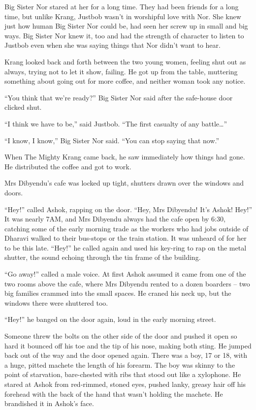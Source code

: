 Big Sister Nor stared at her for a long time. They had been friends
for a long time, but unlike Krang, Justbob wasn't in worshipful
love with Nor. She knew just how human Big Sister Nor could be, had
seen her screw up in small and big ways. Big Sister Nor knew it,
too and had the strength of character to listen to Justbob even
when she was saying things that Nor didn't want to hear.

Krang looked back and forth between the two young women, feeling
shut out as always, trying not to let it show, failing. He got up
from the table, muttering something about going out for more
coffee, and neither woman took any notice.

``You think that we're ready?'' Big Sister Nor said after the
safe-house door clicked shut.

``I think we have to be,'' said Justbob. ``The first casualty of any
battle\ldots{}''

``I know, I know,'' Big Sister Nor said. ``You can stop saying that
now.''

When The Mighty Krang came back, he saw immediately how things had
gone. He distributed the coffee and got to work.

\tb

Mrs Dibyendu's cafe was locked up tight, shutters drawn over the
windows and doors.

``Hey!'' called Ashok, rapping on the door. ``Hey, Mrs Dibyendu! It's
Ashok! Hey!'' It was nearly 7AM, and Mrs Dibyendu always had the
cafe open by 6:30, catching some of the early morning trade as the
workers who had jobs outside of Dharavi walked to their bus-stops
or the train station. It was unheard of for her to be this late.
``Hey!'' he called again and used his key-ring to rap on the metal
shutter, the sound echoing through the tin frame of the building.

``Go away!'' called a male voice. At first Ashok assumed it came from
one of the two rooms above the cafe, where Mrs Dibyendu rented to a
dozen boarders -- two big families crammed into the small spaces.
He craned his neck up, but the windows there were shuttered too.

``Hey!'' he banged on the door again, loud in the early morning
street.

Someone threw the bolts on the other side of the door and pushed it
open so hard it bounced off his toe and the tip of his nose, making
both sting. He jumped back out of the way and the door opened
again. There was a boy, 17 or 18, with a huge, pitted machete the
length of his forearm. The boy was skinny to the point of
starvation, bare-chested with ribs that stood out like a xylophone.
He stared at Ashok from red-rimmed, stoned eyes, pushed lanky,
greasy hair off his forehead with the back of the hand that wasn't
holding the machete. He brandished it in Ashok's face.

